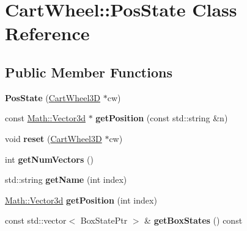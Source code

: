\hypertarget{classCartWheel_1_1PosState}{
\section{CartWheel::PosState Class Reference}
\label{classCartWheel_1_1PosState}
}
\subsection*{Public Member Functions}
\begin{DoxyCompactItemize}
\item 
\hypertarget{classCartWheel_1_1PosState_ab59031c441ec475768f7642808f085d4}{
{\bfseries PosState} (\hyperlink{classCartWheel_1_1CartWheel3D}{CartWheel3D} $\ast$cw)}
\label{classCartWheel_1_1PosState_ab59031c441ec475768f7642808f085d4}

\item 
\hypertarget{classCartWheel_1_1PosState_ad4ed2077365a02159121428f642b17de}{
const \hyperlink{classCartWheel_1_1Math_1_1Vector3d}{Math::Vector3d} $\ast$ {\bfseries getPosition} (const std::string \&n)}
\label{classCartWheel_1_1PosState_ad4ed2077365a02159121428f642b17de}

\item 
\hypertarget{classCartWheel_1_1PosState_a2e7556ccc81a67a8a1075dc225df1b0d}{
void {\bfseries reset} (\hyperlink{classCartWheel_1_1CartWheel3D}{CartWheel3D} $\ast$cw)}
\label{classCartWheel_1_1PosState_a2e7556ccc81a67a8a1075dc225df1b0d}

\item 
\hypertarget{classCartWheel_1_1PosState_a74b8ec593116e412226d78ad29f471fd}{
int {\bfseries getNumVectors} ()}
\label{classCartWheel_1_1PosState_a74b8ec593116e412226d78ad29f471fd}

\item 
\hypertarget{classCartWheel_1_1PosState_a7584c12820fd38849e5aa4cef84426c0}{
std::string {\bfseries getName} (int index)}
\label{classCartWheel_1_1PosState_a7584c12820fd38849e5aa4cef84426c0}

\item 
\hypertarget{classCartWheel_1_1PosState_a94a30e589af66a0df320a527d8cc2fd3}{
\hyperlink{classCartWheel_1_1Math_1_1Vector3d}{Math::Vector3d} {\bfseries getPosition} (int index)}
\label{classCartWheel_1_1PosState_a94a30e589af66a0df320a527d8cc2fd3}

\item 
\hypertarget{classCartWheel_1_1PosState_aea4a96912649f5d1b18461d7560ffc6d}{
const std::vector$<$ BoxStatePtr $>$ \& {\bfseries getBoxStates} () const }
\label{classCartWheel_1_1PosState_aea4a96912649f5d1b18461d7560ffc6d}

\end{DoxyCompactItemize}
